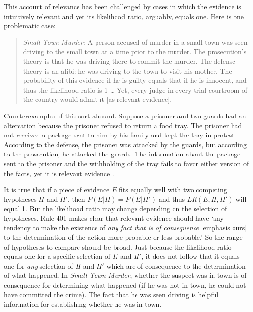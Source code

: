 \documentclass{article}
\begin{document}
This account of relevance has been challenged by cases in which the evidence 
is intuitively relevant and yet
its likelihood ratio, arguably, equals one. Here is one problematic case:
\begin{quote}
	\emph{Small Town Murder:} A person accused of murder in a small town was seen driving to the small town at a time prior to the murder. The prosecution's theory is that he was driving there to commit the murder. The defense theory is an alibi: he was driving to the town to visit his mother. The probability of this evidence if he is guilty equals that if he is innocent, and thus the likelihood ratio is 1 \dots %
	Yet, every judge in every trial courtroom of the country would admit it [as relevant evidence]. %
	\citep[The difficulty has been formulated by Ronald Allen, see the discussion in][]{park2010BayesWarsRedivivus}
	\end{quote}
\noindent 
Counterexamples of this sort abound. Suppose a prisoner and two guards had an altercation because the prisoner refused to return a food tray.  The prisoner had not received a package sent to him by his family and kept the tray in protest. According to the defense, the prisoner was attacked by the guards, but according to the prosecution, he attacked the guards. The information about the package sent to the prisoner and the withholding of the tray fails to favor either version of the facts, yet it is relevant evidence \citep{pardo2013NaturePurposeEvidence}.




It is true that if a piece of evidence $E$ fits equally well with two competing hypotheses  $H$ and $H'$,  then $P(E\vert H)=P(E\vert H')$ and thus $LR(E,H,H')$ will equal 1. But the likelihood ratio may change depending on the selection of hypotheses. Rule 401 makes clear that relevant 
evidence should have `any tendency to make the existence of \emph{any fact that is of consequence} [emphasis ours] to the determination of the action more probable or less probable.' So the range of hypotheses to compare should be broad. Just because the likelihood ratio equals one for a specific selection of $H$ and $H'$, it does not follow that it equals one for \textit{any} selection of $H$ and $H'$ which are of consequence to the determination of what happened.  In \textit{Small Town Murder}, whether the suspect was in town is of consequence for determining what happened  (if he was not in town, he could not have committed the crime). The fact that he was seen driving is helpful information for establishing whether he was in town.  
\end{document}
